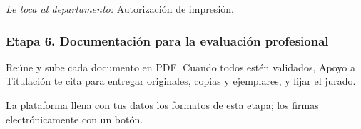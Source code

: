 \emph{Le toca al departamento:} Autorización de impresión. 
\subsubsection*{Etapa 6. Documentación para la evaluación profesional}
Reúne y sube cada documento en PDF. Cuando todos estén validados, Apoyo a Titulación te cita para entregar originales, copias y ejemplares, y fijar el jurado.

La plataforma llena con tus datos los formatos de esta etapa; los firmas electrónicamente con un botón.

